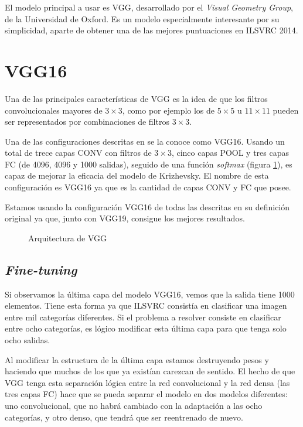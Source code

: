 El modelo principal a usar es VGG, desarrollado por el \textit{Visual Geometry Group}, de la Universidad de Oxford. Es un modelo especialmente interesante por su simplicidad, aparte de obtener una de las mejores puntuaciones en ILSVRC 2014.

\section{VGG16}

Una de las principales características de VGG es la idea de que los filtros convolucionales mayores de $3\times3$, como por ejemplo los de $5\times5$ u $11\times11$ pueden ser representados por combinaciones de filtros $3\times3$.

Una de las configuraciones descritas en \parencite{simonyan} se la conoce como VGG16. Usando un total de trece capas CONV con filtros de $3\times3$, cinco capas POOL y tres capas FC (de 4096, 4096 y 1000 salidas), seguido de una función \textit{softmax} (figura \ref{vgg16-arch}), es capaz de mejorar la eficacia del modelo de Krizhevsky. El nombre de esta configuración es VGG16 ya que es la cantidad de capas CONV y FC que posee.

Estamos usando la configuración VGG16 de todas las descritas en su definición original ya que, junto con VGG19, consigue los mejores resultados.

\begin{figure}
  \caption{Arquitectura de VGG}
\label{vgg16-arch}
\end{figure}

\subsection{\textit{Fine-tuning}}

Si observamos la última capa del modelo VGG16, vemos que la salida tiene 1000 elementos. Tiene esta forma ya que ILSVRC consistía en clasificar una imagen entre mil categorías diferentes. Si el problema a resolver consiste en clasificar entre ocho categorías, es lógico modificar esta última capa para que tenga solo ocho salidas.

Al modificar la estructura de la última capa estamos destruyendo pesos y haciendo que muchos de los que ya existían carezcan de sentido. El hecho de que VGG tenga esta separación lógica entre la red convolucional y la red densa (las tres capas FC) hace que se pueda separar el modelo en dos modelos diferentes: uno convolucional, que no habrá cambiado con la adaptación a las ocho categorías, y otro denso, que tendrá que ser reentrenado de nuevo.

